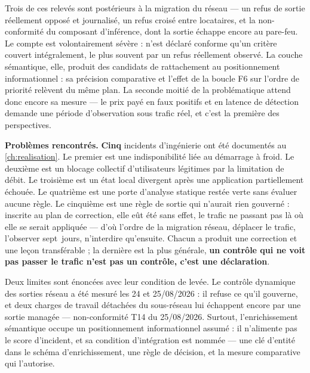 Trois de ces relevés sont postérieurs à la migration du réseau --- un refus de sortie réellement
opposé et journalisé, un refus croisé entre locataires, et la non-conformité du composant
d'inférence, dont la sortie échappe encore au pare-feu. Le compte est volontairement sévère :
n'est déclaré
conforme qu'un critère couvert intégralement, le plus souvent par un refus réellement observé.
La couche sémantique, elle, produit des candidats de rattachement au positionnement
informationnel : sa précision comparative et l'effet de la boucle F6 sur l'ordre de priorité
relèvent du même plan. La seconde moitié de la problématique attend donc encore sa mesure --- le
prix payé en faux positifs et en latence de détection demande une période d'observation sous
trafic réel, et c'est la première des perspectives.

\textbf{Problèmes rencontrés.} \textbf{Cinq} incidents d'ingénierie ont été documentés au
\cref{ch:realisation}. Le premier est une indisponibilité liée au démarrage à froid. Le deuxième est un
blocage collectif d'utilisateurs légitimes par la limitation de débit. Le troisième est un état
local divergent après une application partiellement échouée. Le quatrième est une porte
d'analyse statique restée verte sans évaluer aucune règle. Le cinquième est une règle de sortie
qui n'aurait rien gouverné : inscrite au plan de correction, elle eût été sans effet, le trafic
ne passant pas là où elle se serait appliquée --- d'où l'ordre de la migration réseau, déplacer
le trafic, l'observer sept~jours, n'interdire qu'ensuite. Chacun a produit une correction et une
leçon transférable ; la dernière est la plus générale, \textbf{un contrôle qui ne voit pas passer
le trafic n'est pas un contrôle, c'est une déclaration}.

Deux limites sont énoncées avec leur condition de levée. Le contrôle dynamique des sorties réseau
a été mesuré les 24 et 25/08/2026 :
il refuse ce qu'il gouverne, et deux charges de travail détachées du sous-réseau lui échappent
encore par une sortie managée --- non-conformité T14 du 25/08/2026. Surtout, l'enrichissement
sémantique occupe un positionnement informationnel assumé : il n'alimente pas le score
d'incident, et sa condition d'intégration est nommée --- une clé d'entité dans le schéma
d'enrichissement, une règle de décision, et la mesure comparative qui l'autorise.

